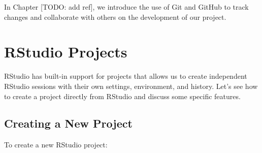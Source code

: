 \documentclass[
  11pt,
]{book}
\begin{document}
In Chapter {[}TODO: add ref{]}, we introduce the use of Git and GitHub to track changes and collaborate with others on the development of our project.

\hypertarget{rstudio-projects}{%
\section{RStudio Projects}\label{rstudio-projects}}

RStudio has built-in support for projects that allows us to create independent RStudio sessions with their own settings, environment, and history. Let's see how to create a project directly from RStudio and discuss some specific features.

\hypertarget{create-proj}{%
\subsection{Creating a New Project}\label{create-proj}}

To create a new RStudio project:
\end{document}
